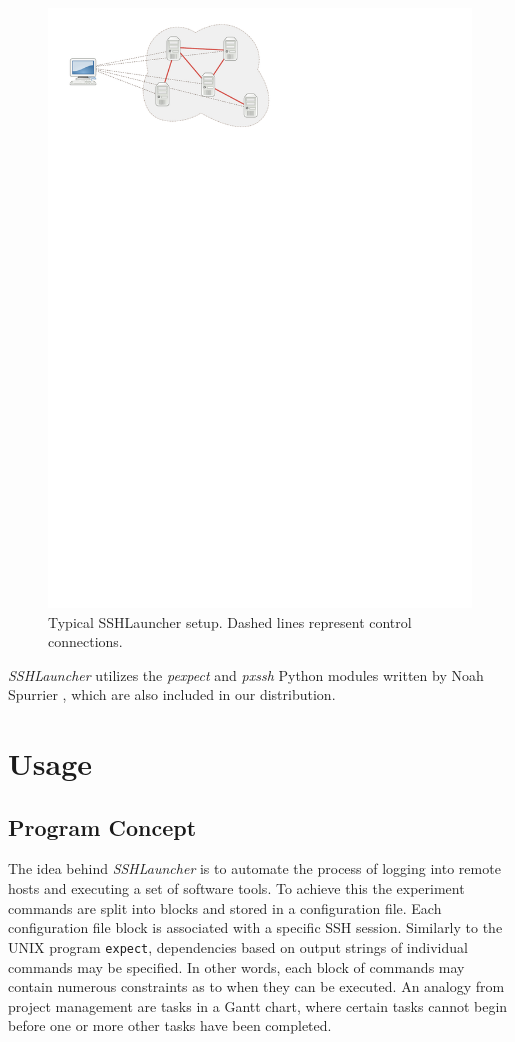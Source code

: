 \begin{figure}
  \centering
  \includegraphics{img/setup_light}
  \caption{Typical SSHLauncher setup. Dashed lines represent
    control connections. }
  \label{fig:setup}
\end{figure}

\emph{SSHLauncher} utilizes the \emph{pexpect} and \emph{pxssh} Python modules written by Noah Spurrier \cite{pexpect}, which are also included in our distribution.

\chapter{Usage}

\section{Program Concept}
The idea behind \emph{SSHLauncher} is to automate the process of logging into remote hosts and executing a set of software tools. To achieve this the experiment commands are split into blocks and stored in a configuration file. Each configuration file block is associated with a specific SSH session. Similarly to the UNIX program \Verb=expect=, dependencies based on output strings of individual commands may be specified. In other words, each block of commands may contain numerous constraints as to when they can be executed. An analogy from project management are tasks in a Gantt chart, where certain tasks cannot begin before one or more other tasks have been completed.

